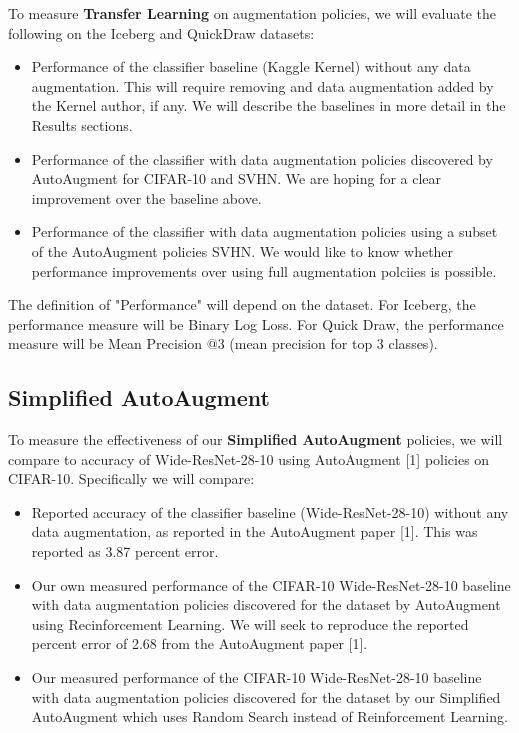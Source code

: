 \documentclass[10pt,twocolumn,letterpaper]{article}
\begin{document}
To measure \textbf{Transfer Learning} on augmentation policies, we will evaluate the following on the Iceberg and QuickDraw datasets:

\begin{itemize}
  \item Performance of the classifier baseline (Kaggle Kernel) without any data augmentation.  This will require removing and data augmentation added by the Kernel author, if any.  We will describe the baselines in more detail in the Results sections.
  \item Performance of the classifier with data augmentation policies discovered by AutoAugment for CIFAR-10 and SVHN.  We are hoping for a clear improvement over the baseline above.
  \item Performance of the classifier with data augmentation policies using a subset of the AutoAugment policies SVHN.  We would like to know whether performance improvements over using full augmentation polciies is possible. 
\end{itemize}

The definition of "Performance" will depend on the dataset.  For Iceberg, the performance measure will be Binary Log Loss.  For Quick Draw, the performance measure will be Mean Precision @3 (mean precision for top 3 classes).

\subsection{Simplified AutoAugment}

To measure the effectiveness of our \textbf{Simplified AutoAugment} policies, we will compare to accuracy of Wide-ResNet-28-10 using AutoAugment [1] policies on CIFAR-10.  Specifically we will compare:

\begin{itemize}
  \item Reported accuracy of the classifier baseline (Wide-ResNet-28-10) without any data augmentation, as reported in the AutoAugment paper [1].  This was reported as 3.87 percent error.
  \item Our own measured performance of the CIFAR-10 Wide-ResNet-28-10 baseline with data augmentation policies discovered for the dataset by AutoAugment using Recinforcement Learning.  We will seek to reproduce the reported percent error of 2.68 from the AutoAugment paper [1].
  \item Our measured performance of the  CIFAR-10 Wide-ResNet-28-10 baseline with data augmentation policies discovered for the dataset by our Simplified AutoAugment which uses Random Search instead of Reinforcement Learning.  
\end{itemize}
\end{document}

